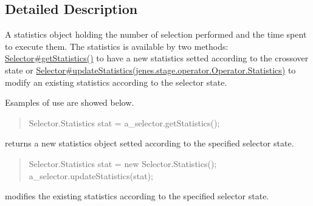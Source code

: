 \subsection{Detailed Description}
A statistics object holding the number of selection performed and the time spent to execute them. The statistics is available by two methods\-: \hyperlink{}{Selector\#get\-Statistics()} to have a new statistics setted according to the crossover state or \hyperlink{}{Selector\#update\-Statistics(jenes.\-stage.\-operator.\-Operator.\-Statistics)} to modify an existing statistics according to the selector state. 

Esamples of use are showed below. 

\begin{quotation}

\begin{DoxyPre}
Selector.Statistics stat = a\_selector.getStatistics();
\end{DoxyPre}
\end{quotation}


returns a new statistics object setted according to the specified selector state. 

\begin{quotation}

\begin{DoxyPre}
Selector.Statistics stat = new Selector.Statistics();
a\_selector.updateStatistics(stat);
\end{DoxyPre}
\end{quotation}


modifies the existing statistics according to the specified selector state. 

